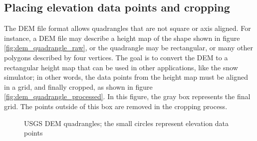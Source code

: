 \subsection{Placing elevation data points and cropping}
\label{sec:usgscropping}
The DEM file format allows quadrangles that are not square or axis aligned. For instance, a DEM file may describe a height map of the shape shown in figure \ref{fig:dem_quadrangle_raw}, or the quadrangle may be rectangular, or many other polygons described by four vertices. The goal is to convert the DEM to a rectangular height map that can be used in other applications, like the snow simulator; in other words, the data points from the height map must be aligned in a grid, and finally cropped, as shown in figure \ref{fig:dem_quadrangle_processed}. In this figure, the gray box represents the final grid. The points outside of this box are removed in the cropping process.

\begin{figure}[ht]
\centering
{}
\qquad
{}
\caption{USGS DEM quadrangles; the small circles represent elevation data points}
\label{fig:dem_quadrangle}
\end{figure}

